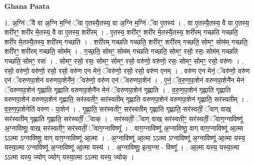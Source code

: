 \documentclass[17pt]{extarticle}
\begin{document}
\textbf{Ghana Paata } \newline

1. अ॒ग्निं ॅवै वा अ॒ग्नि म॒ग्निं ॅवा ए॒तस्यै॒तस्य॒ वा अ॒ग्नि म॒ग्निं ॅवा ए॒तस्य॑ । . वा ए॒तस्यै॒तस्य॒ वै वा ए॒तस्य॒ शरी॑रꣳ॒॒ शरी॑र मे॒तस्य॒ वै वा ए॒तस्य॒ शरी॑रम् । . ए॒तस्य॒ शरी॑रꣳ॒॒ शरी॑र मे॒तस्यै॒तस्य॒ शरी॑रम् गच्छति गच्छति॒ शरी॑र मे॒तस्यै॒तस्य॒ शरी॑रम् गच्छति । . शरी॑रम् गच्छति गच्छति॒ शरी॑रꣳ॒॒ शरी॑रम् गच्छति॒ सोमꣳ॒॒ सोम॑म् गच्छति॒ शरी॑रꣳ॒॒ शरी॑रम् गच्छति॒ सोम᳚म् । . ग॒च्छ॒ति॒ सोमꣳ॒॒ सोम॑म् गच्छति गच्छति॒ सोमꣳ॒॒ रसो॒ रसः॒ सोम॑म् गच्छति गच्छति॒ सोमꣳ॒॒ रसः॑ । . सोमꣳ॒॒ रसो॒ रसः॒ सोमꣳ॒॒ सोमꣳ॒॒ रसो॒ वरु॑णो॒ वरु॑णो॒ रसः॒ सोमꣳ॒॒ सोमꣳ॒॒ रसो॒ वरु॑णः । . रसो॒ वरु॑णो॒ वरु॑णो॒ रसो॒ रसो॒ वरु॑ण एन मेनं॒ ॅवरु॑णो॒ रसो॒ रसो॒ वरु॑ण एनम् । . वरु॑ण एन मेनं॒ ॅवरु॑णो॒ वरु॑ण एनं ॅवरुणपा॒शेन॑ वरुणपा॒शेनै॑नं॒ ॅवरु॑णो॒ वरु॑ण एनं ॅवरुणपा॒शेन॑ । . ए॒नं॒ ॅव॒रु॒ण॒पा॒शेन॑ वरुणपा॒शेनै॑न मेनं ॅवरुणपा॒शेन॑ गृह्णाति गृह्णाति वरुणपा॒शेनै॑न मेनं ॅवरुणपा॒शेन॑ गृह्णाति । . व॒रु॒ण॒पा॒शेन॑ गृह्णाति गृह्णाति वरुणपा॒शेन॑ वरुणपा॒शेन॑ गृह्णाति॒ सर॑स्वतीꣳ॒॒ सर॑स्वतीम् गृह्णाति वरुणपा॒शेन॑ वरुणपा॒शेन॑ गृह्णाति॒ सर॑स्वतीम् । . व॒रु॒ण॒पा॒शेनेति॑ वरुण - पा॒शेन॑ । . गृ॒ह्णा॒ति॒ सर॑स्वतीꣳ॒॒ सर॑स्वतीम् गृह्णाति गृह्णाति॒ सर॑स्वतीं॒ ॅवाग् वाख् सर॑स्वतीम् गृह्णाति गृह्णाति॒ सर॑स्वतीं॒ ॅवाक् । . सर॑स्वतीं॒ ॅवाग् वाख् सर॑स्वतीꣳ॒॒ सर॑स्वतीं॒ ॅवाग॒ग्नाविष्णू॑ अ॒ग्नाविष्णू॒ वाख् सर॑स्वतीꣳ॒॒ सर॑स्वतीं॒ ॅवाग॒ग्नाविष्णू᳚ । . वाग॒ग्नाविष्णू॑ अ॒ग्नाविष्णू॒ वाग् वाग॒ग्नाविष्णू॑ आ॒त्मा ऽऽत्मा ऽग्नाविष्णू॒ वाग् वाग॒ग्नाविष्णू॑ आ॒त्मा । . अ॒ग्नाविष्णू॑ आ॒त्मा ऽऽत्मा ऽग्नाविष्णू॑ अ॒ग्नाविष्णू॑ आ॒त्मा यस्य॒ यस्या॒त्मा ऽग्नाविष्णू॑ अ॒ग्नाविष्णू॑ आ॒त्मा यस्य॑ । . अ॒ग्नाविष्णू॒ इत्य॒ग्ना - विष्णू᳚ । . आ॒त्मा यस्य॒ यस्या॒त्मा ऽऽत्मा यस्य॒ ज्योग् ज्योग् यस्या॒त्मा ऽऽत्मा यस्य॒ ज्योक् । \newline
\end{document}
